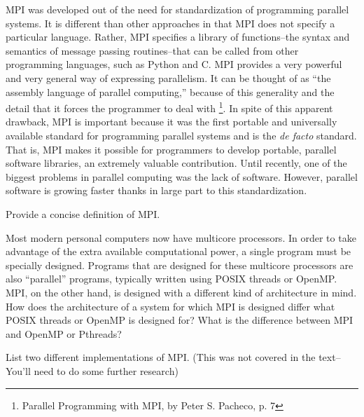 MPI was developed out of the need for standardization of programming parallel systems. It is different than other approaches in that MPI does not specify a particular language. Rather, MPI specifies a library of functions--the syntax and semantics of message passing routines--that can be called from other programming languages, such as Python and C. MPI provides a very powerful and very general way of expressing parallelism. It can be thought of as ``the assembly language of parallel computing,'' because of this generality and the detail that it forces the programmer to deal with
\footnote{Parallel Programming with MPI, by Peter S. Pacheco, p. 7}.
In spite of this apparent drawback, MPI is important because it was the first portable and universally available standard for programming parallel systems and is the \emph{de facto} standard. That is, MPI makes it possible for programmers to develop portable, parallel software libraries, an extremely valuable contribution.
Until recently, one of the biggest problems in parallel computing was the lack of software. However, parallel software is growing faster thanks in large part to this standardization. 

\begin{problem}
Provide a concise definition of MPI.
\end{problem}

\begin{problem}
Most modern personal computers now have multicore processors. 
In order to take advantage of the extra available computational power, a single program must be specially designed. 
Programs that are designed for these multicore processors are also ``parallel'' programs, typically written using POSIX threads or OpenMP.
MPI, on the other hand, is designed with a different kind of architecture in mind. 
How does the architecture of a system for which MPI is designed differ what POSIX threads or OpenMP is designed for? 
What is the difference between MPI and OpenMP or Pthreads?
\end{problem}

\begin{problem}
List two different implementations of MPI. (This was not covered in the text--You'll need to do some further research)
\end{problem}

